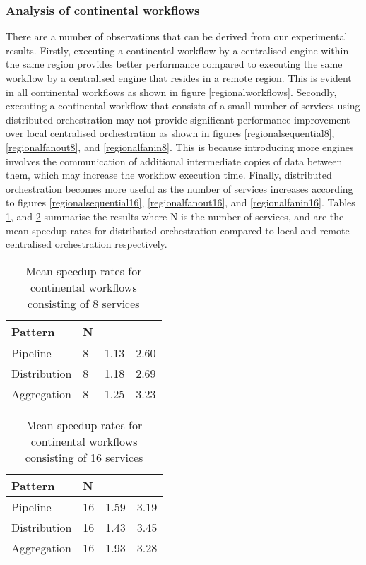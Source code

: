 \documentclass[10pt, conference, compsocconf]{IEEEtran}
\begin{document}
\subsubsection{Analysis of continental workflows}
There are a number of observations that can be derived from our experimental results.
Firstly, executing a continental workflow by a centralised engine within the same region provides better performance compared to executing the same workflow by a centralised engine that resides in a remote region.
This is evident in all continental workflows as shown in figure \ref{regionalworkflows}.
Secondly, executing a continental workflow that consists of a small number of services using distributed orchestration may not provide significant performance improvement over local centralised orchestration as shown in figures \ref{regionalsequential8}, \ref{regionalfanout8}, and \ref{regionalfanin8}.
This is because introducing more engines involves the communication of additional intermediate copies of data between them, which may increase the workflow execution time.
Finally, distributed orchestration becomes more useful as the number of services increases according to figures \ref{regionalsequential16}, \ref{regionalfanout16}, and \ref{regionalfanin16}.
Tables \ref{table1}, and \ref{table2} summarise the results where N is the number of services,  and  are the mean speedup rates for distributed orchestration compared to local and remote centralised orchestration respectively.\\

\begin{table}[h]\normalsize
\caption{Mean speedup rates for continental workflows consisting of 8 services}
\centering
\label{table1}
\begin{center}
\begin{tabular}{| l | l | l | l |}
\hline
Pattern & N &  & \\ \hline
Pipeline& 8& 1.13&2.60\\ \hline
Distribution& 8& 1.18&2.69\\ \hline
Aggregation& 8& 1.25&3.23\\ \hline
\end{tabular}
\end{center}
\end{table}

\begin{table}[h]\normalsize
\caption{Mean speedup rates for continental workflows consisting of 16 services}
\centering
\label{table2}
\begin{center}
\begin{tabular}{| l | l | l | l |}
\hline
Pattern & N &  & \\ \hline
Pipeline& 16&1.59&3.19\\ \hline
Distribution& 16& 1.43&3.45\\ \hline
Aggregation& 16& 1.93&3.28\\ \hline
\end{tabular}
\end{center}
\end{table}
\end{document}
